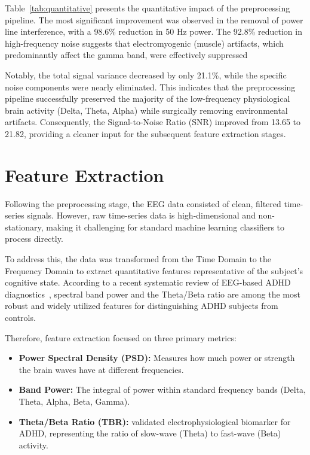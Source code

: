 \documentclass[11pt,a4paper]{article}
\begin{document}
Table~\ref{tab:quantitative} presents the quantitative impact of the preprocessing pipeline. The most significant improvement was observed in 
the removal of power line interference, with a 98.6\% reduction in 50 Hz power. The 92.8\% reduction in high-frequency noise suggests that 
electromyogenic (muscle) artifacts, which predominantly affect the gamma band, were effectively suppressed

Notably, the total signal variance decreased by only 21.1\%, while the specific noise components were nearly eliminated. This indicates that 
the preprocessing pipeline successfully preserved the majority of the low-frequency physiological brain activity (Delta, Theta, Alpha) while 
surgically removing environmental artifacts. Consequently, the Signal-to-Noise Ratio (SNR) improved from 13.65 to 21.82, providing a cleaner 
input for the subsequent feature extraction stages.


\section{Feature Extraction}\label{sec:features}
Following the preprocessing stage, the EEG data consisted of clean, filtered time-series signals. However, raw time-series data is 
high-dimensional and non-stationary, making it challenging for standard machine learning classifiers to process directly.

To address this, the data was transformed from the Time Domain to the Frequency Domain to extract quantitative features representative of the 
subject's cognitive state. According to a recent systematic review of EEG-based ADHD diagnostics~\cite{arpaia2022systematic}, spectral band 
power and the Theta/Beta ratio are among the most robust and widely utilized features for distinguishing ADHD subjects from controls.

Therefore, feature extraction focused on three primary metrics:

\begin{itemize}
    \item \textbf{Power Spectral Density (PSD):} Measures how much power or strength the brain waves have at different frequencies.
    \item \textbf{Band Power:} The integral of power within standard frequency bands (Delta, Theta, Alpha, Beta, Gamma).
    \item \textbf{Theta/Beta Ratio (TBR):}  validated electrophysiological biomarker for ADHD, representing the ratio of slow-wave (Theta) to 
        fast-wave (Beta) activity.
\end{itemize}
\end{document}
